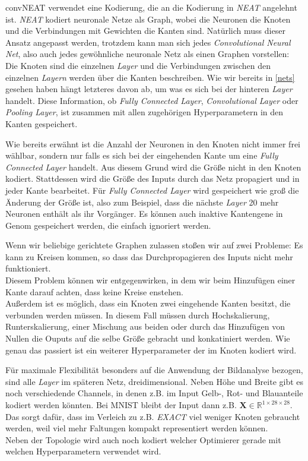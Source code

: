 \documentclass[]{scrartcl}
\begin{document}
			convNEAT verwendet eine Kodierung, die an die Kodierung in \textit{NEAT} angelehnt ist.
			\textit{NEAT} kodiert neuronale Netze als Graph, wobei die Neuronen die Knoten und die Verbindungen mit Gewichten die Kanten sind.
			Natürlich muss dieser Ansatz angepasst werden, trotzdem kann man sich jedes \textit{Convolutional Neural Net},
			also auch jedes gewöhnliche neuronale Netz als einen Graphen vorstellen: \\
			Die Knoten sind die einzelnen \textit{Layer} und die Verbindungen zwischen den einzelnen \textit{Layern} werden über die Kanten beschreiben.
			Wie wir bereits in \ref{nets} gesehen haben hängt letzteres davon ab, um was es sich bei der hinteren \textit{Layer} handelt.
			Diese Information, ob \textit{Fully Connected Layer}, \textit{Convolutional Layer} oder \textit{Pooling Layer}, ist zusammen mit allen
			zugehörigen Hyperparametern in den Kanten gespeichert.

			Wie bereits erwähnt ist die Anzahl der Neuronen in den Knoten nicht immer frei wählbar, sondern nur falls es sich bei der eingehenden Kante
			um eine \textit{Fully Connected Layer} handelt. Aus diesem Grund wird die Größe nicht in den Knoten kodiert.
			Stattdessen wird die Größe des Inputs durch das Netz propagiert und in jeder Kante bearbeitet. Für \textit{Fully Connected Layer} wird gespeichert
			wie groß die Änderung der Größe ist, also zum Beispiel, dass die nächste \textit{Layer} 20 mehr Neuronen enthält als ihr Vorgänger.
			Es können auch inaktive Kantengene in Genom gespeichert werden, die einfach ignoriert werden.

			Wenn wir beliebige gerichtete Graphen zulassen stoßen wir auf zwei Probleme:
			Es kann zu Kreisen kommen, so dass das Durchpropagieren des Inputs nicht mehr funktioniert. \\
			Diesem Problem können wir entgegenwirken, in dem wir beim Hinzufügen einer Kante darauf achten, dass keine Kreise enstehen. \\
			Außerdem ist es möglich, dass ein Knoten zwei eingehende Kanten besitzt, die verbunden werden müssen.
			In diesem Fall müssen durch Hochskalierung, Runterskalierung, einer Mischung aus beiden oder durch das Hinzufügen von Nullen die 
			Ouputs auf die selbe Größe gebracht und konkatiniert werden. Wie genau das passiert ist ein weiterer Hyperparameter der im Knoten kodiert wird.

			Für maximale Flexibilität besonders auf die Anwendung der Bildanalyse bezogen, sind alle \textit{Layer} im späteren Netz, dreidimensional.
			Neben Höhe und Breite gibt es noch verschiedende Channels, in denen z.B. im Input Gelb-, Rot- und Blauanteile kodiert werden könnten.
			Bei MNIST bleibt der Input dann z.B. $\mathbf{X} \in \mathbb{R}^{1 \times 28 \times 28}$.
			Das sorgt dafür, dass im Verleich zu z.B. \textit{EXACT} viel weniger Knoten gebraucht werden, weil viel mehr Faltungen kompakt
			representiert werden können. \\
			Neben der Topologie wird auch noch kodiert welcher Optimierer gerade mit welchen Hyperparametern verwendet wird.
\end{document}
